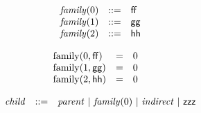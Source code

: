 $$
\begin{array}{@{}lrrl@{}l@{}}
& {\mathit{family}}(0) &::=& \mathsf{ff} \\
& {\mathit{family}}(1) &::=& \mathsf{gg} \\
& {\mathit{family}}(2) &::=& \mathsf{hh} \\
\end{array}
$$

$$
\begin{array}{@{}lcl@{}l@{}}
{\mathrm{family}}(0, \mathsf{ff}) &=& 0 \\
{\mathrm{family}}(1, \mathsf{gg}) &=& 0 \\
{\mathrm{family}}(2, \mathsf{hh}) &=& 0 \\
\end{array}
$$

$$
\begin{array}{@{}lrrl@{}l@{}}
& {\mathit{child}} &::=& {\mathit{parent}} ~|~ {\mathit{family}}(0) ~|~ {\mathit{indirect}} ~|~ \mathsf{zzz} \\
\end{array}
$$

